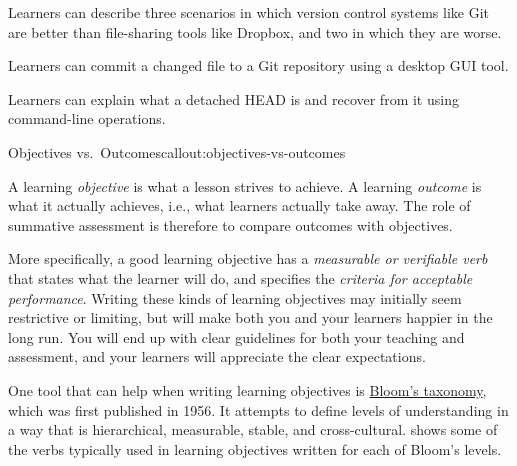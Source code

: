 \begin{gitemize}

\item
  Learners can describe three scenarios in which version control
  systems like Git are better than file-sharing tools like Dropbox,
  and two in which they are worse.

\item
  Learners can commit a changed file to a Git repository using a
  desktop GUI tool.

\item
  Learners can explain what a detached HEAD is and recover from it
  using command-line operations.

\end{gitemize}

\begin{callout}{Objectives vs.\ Outcomes}{callout:objectives-vs-outcomes}

A learning \emph{objective} is what a lesson strives to achieve.  A
learning \emph{outcome} is what it actually achieves, i.e., what
learners actually take away.  The role of summative assessment is
therefore to compare outcomes with objectives.

\end{callout}

More specifically, a good learning objective has a \emph{measurable or
verifiable verb} that states what the learner will do, and specifies
the \emph{criteria for acceptable performance}.  Writing these kinds
of learning objectives may initially seem restrictive or limiting, but
will make both you and your learners happier in the long run. You will
end up with clear guidelines for both your teaching and assessment,
and your learners will appreciate the clear expectations.

One tool that can help when writing learning objectives is
\href{https://en.wikipedia.org/wiki/Bloom's\_taxonomy}{Bloom's taxonomy},
which was first published in 1956.  It attempts to define levels of
understanding in a way that is hierarchical, measurable, stable, and
cross-cultural.   shows some of the verbs typically
used in learning objectives written for each of Bloom's levels.

